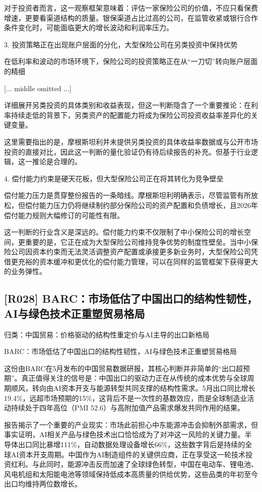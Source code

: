 \documentclass[11pt]{ctexart}
\begin{document}
对于投资者而言，这一观察框架意味着：评估一家保险公司的价值，不应只看保费增速，更要看渠道结构的质量。银保渠道占比过高的公司，在监管收紧或银行合作条件变化时，可能面临更大的增长波动和利润率压力。

3. 投资策略正在出现账户层面的分化，大型保险公司在另类投资中保持优势

在低利率和波动的市场环境下，保险公司的投资策略正在从“一刀切”转向账户层面的精细

[... middle omitted ...]

详细展开另类投资的具体类别和收益表现，但这一判断隐含了一个重要推论：在利率持续走低的背景下，另类资产的配置能力将成为保险公司投资收益率差异化的关键变量。

这里需要指出的是，摩根斯坦利并未提供另类投资的具体收益率数据或与公开市场投资的直接对比，因此这一判断的量化验证仍有待后续报告的补充。但基于行业逻辑，这一推论是合理的。

4. 偿付能力约束是硬天花板，但大型保险公司正在将其转化为竞争壁垒

偿付能力压力是贯穿整份报告的一条暗线。摩根斯坦利明确表示，尽管监管有所放松，但偿付能力压力仍将继续制约部分保险公司的资产配置和负债增长，且2026年偿付能力规则大幅修订的可能性有限。

这一判断的行业含义是深远的。偿付能力约束不仅限制了中小保险公司的增长空间，更重要的是，它正在成为大型保险公司维持竞争优势的制度性壁垒。当中小保险公司因资本约束而无法灵活调整资产配置或承接更多新业务时，大型保险公司凭借更充裕的资本缓冲和更优化的偿付能力管理，可以在同样的监管框架下获得更大的业务弹性。

\subsection{[R028] BARC：市场低估了中国出口的结构性韧性，AI与绿色技术正重塑贸易格局}
{\small\color{refgray}归类：中国贸易：价格驱动的结构性重定价与AI主导的出口新格局}

BARC：市场低估了中国出口的结构性韧性，AI与绿色技术正重塑贸易格局

这份由BARC在5月发布的中国贸易数据研报，其核心判断并非简单的“出口超预期”。真正值得关注的信号是：中国出口的驱动力正在从传统的成本优势与全球周期顺风，转向由AI资本开支与能源转型共同支撑的结构性需求。5月出口同比增长19.4\%，远超市场预期的15\%，这背后不是一次性的基数效应，而是全球制造业活动持续处于四年高位（PMI 52.6）与高附加值产品需求爆发共同作用的结果。

报告揭示了一个重要的产业现实：市场此前担心中东能源冲击会抑制外部需求，但事实证明，AI相关产品与绿色技术出口恰恰成为了对冲这一风险的关键力量。半导体出口同比暴增111\%，自动数据处理设备增长66\%，这些数字背后是持续的全球AI资本开支周期。中国作为AI制造组件的关键供应商，正在享受这一轮技术投资红利。与此同时，能源冲击反而加速了全球绿色转型，中国在电动车、锂电池、风电机组和太阳能电池等领域保持低成本高质量的供给优势，这些品类的年初至今出口均维持两位数增长。
\end{document}
